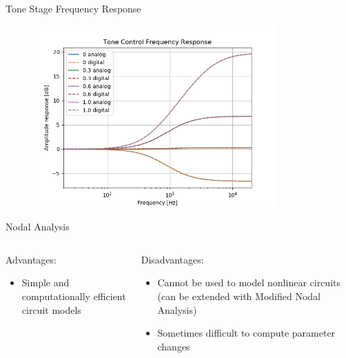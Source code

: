 \begin{frame}{Tone Stage Frequency Response}
    \begin{figure}
        \centering
        \includegraphics[height=2.75in]{../Paper/Figures/ToneFreq.png}
    \end{figure}
\end{frame}

\begin{frame}{Nodal Analysis}
    \begin{columns}
        \begin{column}{0.5\linewidth}
            \hspace{-1ex}
            Advantages:
            \vspace{1ex}
            \begin{itemize}
                \itemsep0.5em
                \item Simple and computationally efficient circuit models
            \end{itemize}
        \end{column}
        \begin{column}{0.5\linewidth}
            \hspace{-1ex}
            Disadvantages:
            \vspace{1ex}
            \begin{itemize}
                \itemsep0.5em
                \item Cannot be used to model nonlinear circuits (can be extended with Modified Nodal Analysis)
                \item Sometimes difficult to compute parameter changes
            \end{itemize}
        \end{column}
    \end{columns}
\end{frame}

